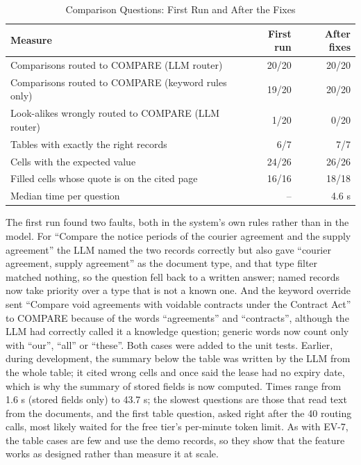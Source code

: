 \begin{table}[H]\centering
\caption{Comparison Questions: First Run and After the Fixes}\label{tab:ev-compare}
\begin{tabular}{|l|r|r|}\hline
\textbf{Measure} & \textbf{First run} & \textbf{After fixes} \\ \hline
Comparisons routed to COMPARE (LLM router) & 20/20 & 20/20 \\ \hline
Comparisons routed to COMPARE (keyword rules only) & 19/20 & 20/20 \\ \hline
Look-alikes wrongly routed to COMPARE (LLM router) & 1/20 & 0/20 \\ \hline
Tables with exactly the right records & 6/7 & 7/7 \\ \hline
Cells with the expected value & 24/26 & 26/26 \\ \hline
Filled cells whose quote is on the cited page & 16/16 & 18/18 \\ \hline
Median time per question & -- & 4.6 s \\ \hline
\end{tabular}
\end{table}
The first run found two faults, both in the system's own rules rather than in the model. For ``Compare the notice
periods of the courier agreement and the supply agreement'' the LLM named the two records correctly but also gave
``courier agreement, supply agreement'' as the document type, and that type filter matched nothing, so the
question fell back to a written answer; named records now take priority over a type that is not a known one. And
the keyword override sent ``Compare void agreements with voidable contracts under the Contract Act'' to COMPARE
because of the words ``agreements'' and ``contracts'', although the LLM had correctly called it a knowledge
question; generic words now count only with ``our'', ``all'' or ``these''. Both cases were added to the unit
tests. Earlier, during development, the summary below the table was written by the LLM from the whole table; it
cited wrong cells and once said the lease had no expiry date, which is why the summary of stored fields is now
computed. Times range from 1.6 s (stored fields only) to 43.7 s; the slowest questions are those that read text
from the documents, and the first table question, asked right after the 40 routing calls, most likely waited for
the free tier's per-minute token limit. As with EV-7, the table cases are few and use the demo records, so they
show that the feature works as designed rather than measure it at scale.

